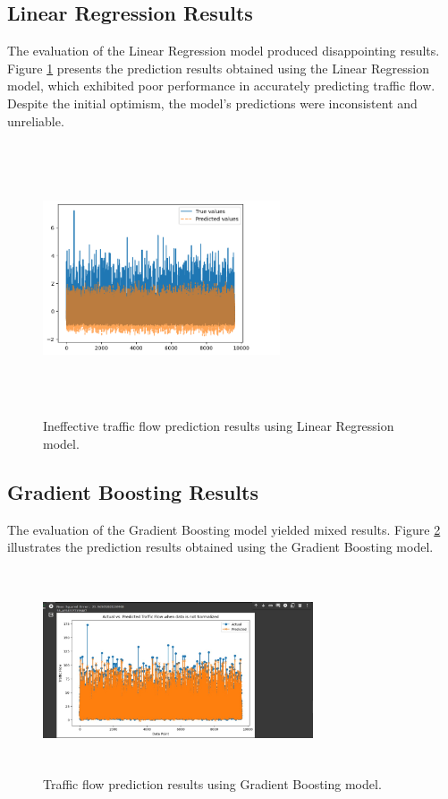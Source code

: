 \documentclass{IEEEtran}
\begin{document}
\subsection{Linear Regression Results}

The evaluation of the Linear Regression model produced disappointing results. Figure \ref{fig:linear_regression_results} presents the prediction results obtained using the Linear Regression model, which exhibited poor performance in accurately predicting traffic flow. Despite the initial optimism, the model's predictions were inconsistent and unreliable.

\begin{figure}[h]
    \centering
    \includegraphics[width=7cm, height=8cm]{Linear_result.png}
    \caption{Ineffective traffic flow prediction results using Linear Regression model.}
    \label{fig:linear_regression_results}
\end{figure}

\subsection{Gradient Boosting Results}

The evaluation of the Gradient Boosting model yielded mixed results. Figure \ref{fig:gradient_boosting_results} illustrates the prediction results obtained using the Gradient Boosting model.

\begin{figure}[h]
    \centering
    \includegraphics[width=8cm, height=6cm]{Gradient_boosting.png}
    \caption{Traffic flow prediction results using Gradient Boosting model.}
    \label{fig:gradient_boosting_results}
\end{figure}
\end{document}
